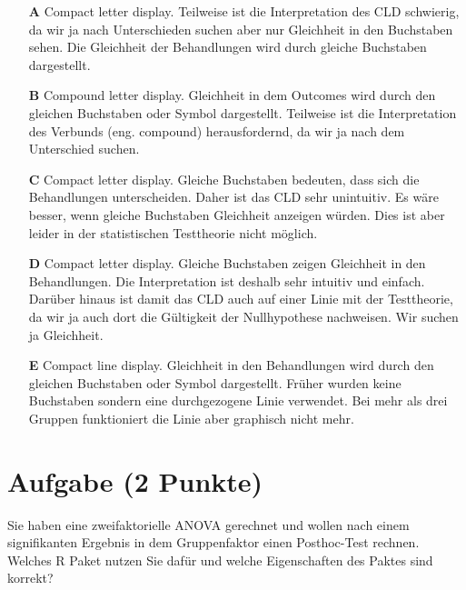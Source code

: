 \documentclass[a4paper, 9pt]{scrartcl}\usepackage[]{graphicx}\usepackage[]{xcolor}
\begin{document}
\begin{enumerate}
\item [\textbf{A} \msquare] Compact letter display. Teilweise ist die Interpretation des CLD schwierig, da wir ja nach Unterschieden suchen aber nur Gleichheit in den Buchstaben sehen. Die Gleichheit der Behandlungen wird durch gleiche Buchstaben dargestellt.
\item [\textbf{B} \msquare] Compound letter display. Gleichheit in dem Outcomes wird durch den gleichen Buchstaben oder Symbol dargestellt. Teilweise ist die Interpretation des Verbunds (eng. compound) herausfordernd, da wir ja nach dem Unterschied suchen.
\item [\textbf{C} \msquare] Compact letter display. Gleiche Buchstaben bedeuten, dass sich die Behandlungen unterscheiden. Daher ist das CLD sehr unintuitiv. Es wäre besser, wenn gleiche Buchstaben Gleichheit anzeigen würden. Dies ist aber leider in der statistischen Testtheorie nicht möglich.
\item [\textbf{D} \msquare] Compact letter display. Gleiche Buchstaben zeigen Gleichheit in den Behandlungen. Die Interpretation ist deshalb sehr intuitiv und einfach. Darüber hinaus ist damit das CLD auch auf einer Linie mit der Testtheorie, da wir ja auch dort die Gültigkeit der Nullhypothese nachweisen. Wir suchen ja Gleichheit.
\item [\textbf{E} \msquare] Compact line display. Gleichheit in den Behandlungen wird durch den gleichen Buchstaben oder Symbol dargestellt. Früher wurden keine Buchstaben sondern eine durchgezogene Linie verwendet. Bei mehr als drei Gruppen funktioniert die Linie aber graphisch nicht mehr.
\end{enumerate}

\section{Aufgabe \hfill (2 Punkte)}




Sie haben eine zweifaktorielle ANOVA gerechnet und wollen nach einem signifikanten Ergebnis in dem Gruppenfaktor einen Posthoc-Test rechnen. Welches R Paket nutzen Sie dafür und welche Eigenschaften des Paktes sind korrekt?
\end{document}
